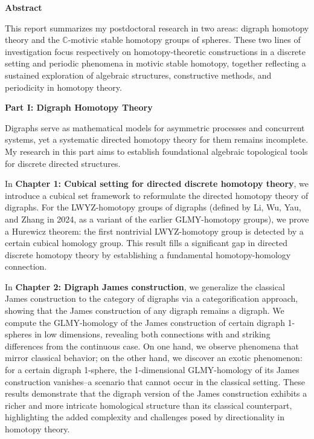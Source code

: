 \documentclass[12pt,a4paper]{report}
\theoremstyle{plain}
\theoremstyle{definition}
\newcommand{\C}{\mathbb{C}}
\begin{document}


\pagestyle{plain}
{}

\newpage

\noindent
\begin{center}
{\Huge {\bf Abstract}}	
\end{center}	
\vspace{1.0cm}

\noindent

This report summarizes my postdoctoral research in two areas: digraph homotopy theory and the $\C$-motivic stable homotopy groups of spheres. These two lines of investigation focus respectively on homotopy-theoretic constructions in a discrete setting and periodic phenomena in motivic stable homotopy, together reflecting a sustained exploration of algebraic structures, constructive methods, and periodicity in homotopy theory.

\begin{center}
\textbf{Part I: Digraph Homotopy Theory}
\end{center}

Digraphs serve as mathematical models for asymmetric processes and concurrent systems, yet a systematic directed homotopy theory for them remains incomplete. My research in this part aims to establish foundational algebraic topological tools for discrete directed structures.

In \textbf{Chapter 1: Cubical setting for directed discrete homotopy theory}, we introduce a cubical set framework to reformulate the directed homotopy theory of digraphs. For the LWYZ-homotopy groups of digraphs (defined by Li, Wu, Yau, and Zhang in 2024, as a variant of the earlier GLMY-homotopy groups), we prove a Hurewicz theorem: the first nontrivial LWYZ-homotopy group is detected by a certain cubical homology group. This result fills a significant gap in directed discrete homotopy theory by establishing a fundamental homotopy-homology connection.

In \textbf{Chapter 2: Digraph James construction}, we generalize the classical James construction to the category of digraphs via a categorification approach, showing that the James construction of any digraph remains a digraph. We compute the GLMY-homology of the James construction of certain digraph 1-spheres in low dimensions, revealing both connections with and striking differences from the continuous case. On one hand, we observe phenomena that mirror classical behavior; on the other hand, we discover an exotic phenomenon: for a certain digraph 1-sphere, the 1-dimensional GLMY-homology of its James construction vanishes--a scenario that cannot occur in the classical setting. These results demonstrate that the digraph version of the James construction exhibits a richer and more intricate homological structure than its classical counterpart, highlighting the added complexity and challenges posed by directionality in homotopy theory.
\end{document}
